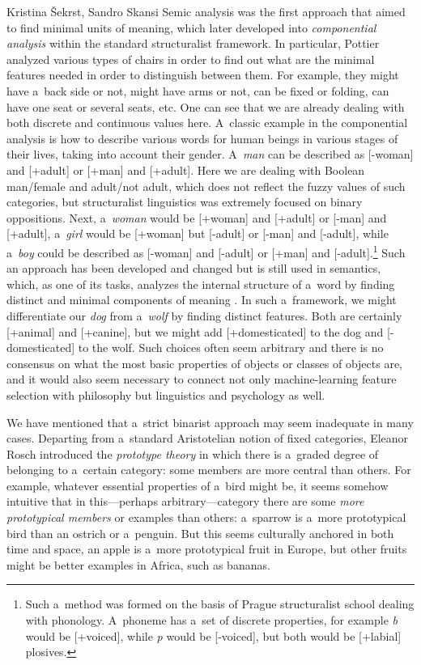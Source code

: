 \begin{artengenv2auth}{Kristina Šekrst, Sandro Skansi}
Semic analysis was the first approach that aimed to find minimal units of meaning, which later developed into \textit{componential analysis} within the standard structuralist framework. In particular, Pottier
\parencite*[][]{pottier_vers_1964} %
 analyzed various types of chairs in order to find out what are the minimal features needed in order to distinguish between them. For example, they might have a~back side or not, might have arms or not, can be fixed or folding, can have one seat or several seats, etc. One can see that we are already dealing with both discrete and continuous values here. A~classic example in the componential analysis is how to describe various words for human beings in various stages of their lives, taking into account their gender. A~\textit{man} can be described as [-woman] and [+adult] or [+man] and [+adult]. Here we are dealing with Boolean man/female and adult/not adult, which does not reflect the fuzzy values of such categories, but structuralist linguistics was extremely focused on binary oppositions. Next, a~\textit{woman} would be [+woman] and [+adult] or [-man] and [+adult], a~\textit{girl} would be [+woman] but [-adult] or [-man] and [-adult], while a~\textit{boy} could be described as [-woman] and [-adult] or [+man] and [-adult].\footnote{Such a~method was formed on the basis of Prague structuralist school dealing with phonology. A~phoneme has a~set of discrete properties, for example \textit{b} would be [+voiced], while \textit{p} would be [-voiced], but both would be [+labial] plosives.} Such an approach has been developed and changed but is still used in semantics, which, as one of its tasks, analyzes the internal structure of a~word by finding distinct and minimal components of meaning 
\parencite[][p.108]{palmer_semantics_1981}. %
 In such a~framework, we might differentiate our \textit{dog} from a~\textit{wolf} by finding distinct features. Both are certainly [+animal] and [+canine], but we might add [+domesticated] to the dog and [-domesticated] to the wolf. Such choices often seem arbitrary and there is no consensus on what the most basic properties of objects or classes of objects are, and it would also seem necessary to connect not only machine-learning feature selection with philosophy but linguistics and psychology as well.

We have mentioned that a~strict binarist approach may seem inadequate in many cases. Departing from a~standard Aristotelian notion of fixed categories, Eleanor Rosch
\parencite*[][]{rosch_natural_1973} %
 introduced the \textit{prototype theory} in which there is a~graded degree of belonging to a~certain category: some members are more central than others. For example, whatever essential properties of a~bird might be, it seems somehow intuitive that in this—perhaps arbitrary—category there are some \textit{more prototypical members} or examples than others: a~sparrow is a~more prototypical bird than an ostrich or a~penguin. But this seems culturally anchored in both time and space, an apple is a~more prototypical fruit in Europe, but other fruits might be better examples in Africa, such as bananas.


\end{artengenv2auth}
